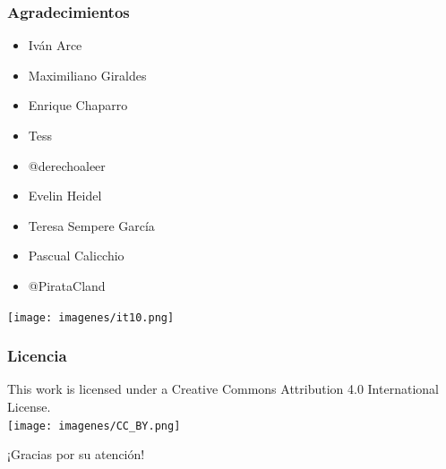 \documentclass{beamer}
\begin{document}
\begin{frame}
  \frametitle{Agradecimientos}
  \begin{itemize}
\item Iván Arce
\item Maximiliano Giraldes
\item Enrique Chaparro
\item Tess
\item @derechoaleer
\item Evelin Heidel
\item Teresa Sempere García
\item Pascual Calicchio
\item @PirataCland
\end{itemize}

\begin{center}
\texttt{[image: imagenes/it10.png]}
\end{center}
\end{frame}

\begin{frame}
\frametitle{Licencia}
\begin{center}
This work is licensed under a Creative Commons Attribution 4.0 International License. \\
\texttt{[image: imagenes/CC\_BY.png]}
\end{center}
\end{frame}

\begin{frame}
\begin{center}
¡Gracias por su atención!
\end{center}
\end{frame}
\end{document}
